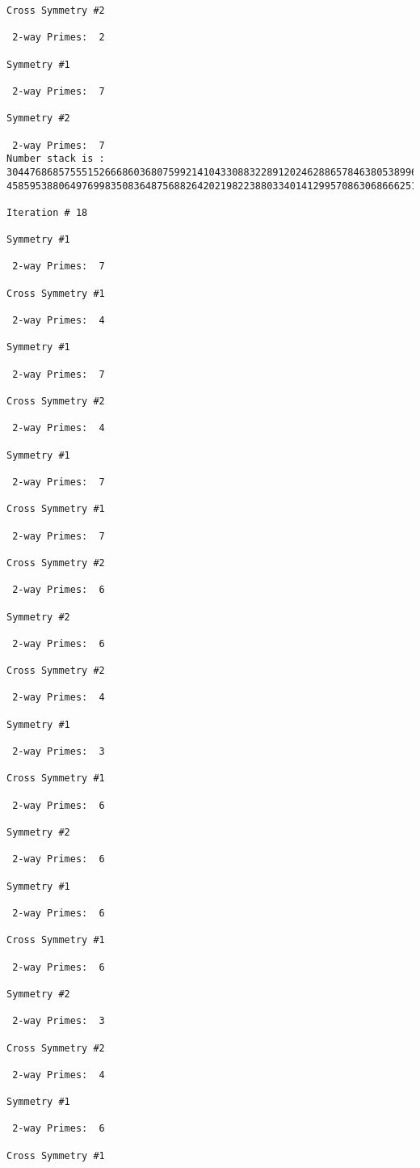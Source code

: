 {{{{\begin{verbatim}
Cross Symmetry #2

 2-way Primes: 	2

Symmetry #1

 2-way Primes: 	7

Symmetry #2

 2-way Primes: 	7
Number stack is :
30447686857555152666860368075992141043308832289120246288657846380538996794608835958544046240163340857
45859538806497699835083648756882642021982238803340141299570863068666251555758686744037580433610426404

Iteration #	18

Symmetry #1

 2-way Primes: 	7

Cross Symmetry #1

 2-way Primes: 	4

Symmetry #1

 2-way Primes: 	7

Cross Symmetry #2

 2-way Primes: 	4

Symmetry #1

 2-way Primes: 	7

Cross Symmetry #1

 2-way Primes: 	7

Cross Symmetry #2

 2-way Primes: 	6

Symmetry #2

 2-way Primes: 	6

Cross Symmetry #2

 2-way Primes: 	4

Symmetry #1

 2-way Primes: 	3

Cross Symmetry #1

 2-way Primes: 	6

Symmetry #2

 2-way Primes: 	6

Symmetry #1

 2-way Primes: 	6

Cross Symmetry #1

 2-way Primes: 	6

Symmetry #2

 2-way Primes: 	3

Cross Symmetry #2

 2-way Primes: 	4

Symmetry #1

 2-way Primes: 	6

Cross Symmetry #1


\end{verbatim}}}}}
